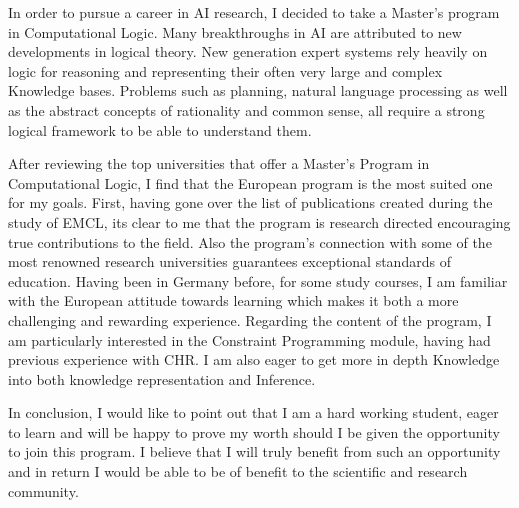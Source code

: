 \documentclass[10pt,stdletter,dateno,sigleft]{newlfm} %
\begin{document}
\begin{newlfm}
  In order to pursue a career in AI research, I decided to take a Master's program in
  Computational Logic. Many breakthroughs in AI are attributed to new
  developments in logical theory. New generation expert systems rely heavily on
  logic for reasoning and representing their often very large and complex
  Knowledge bases. Problems such as planning, natural language processing as
  well as the abstract concepts of rationality and common sense, all require
  a strong logical framework to be able to understand them.

  After reviewing the top universities that offer a Master's Program in
  Computational Logic, I find that the European program is the most suited one
  for my goals. First, having gone over the list of publications created during
  the study of EMCL, its clear to me that the program is research directed
  encouraging true contributions to the field. Also the program's connection
  with some of the most renowned research universities guarantees exceptional
  standards of education. Having been in Germany before, for some study courses,
  I am familiar with the European attitude towards learning which makes it both
  a more challenging and rewarding experience. Regarding the content of the
  program, I am particularly interested in the Constraint Programming module,
  having had previous experience with CHR. I am also eager to get more in depth
  Knowledge into both knowledge representation and Inference.

  In conclusion, I would like to point out that I am a hard working student,
  eager to learn and will be happy to prove my worth should I be given the
  opportunity to join this program. I believe that I will truly benefit from
  such an opportunity and in return I would be able to be of benefit to the
  scientific and research community.

\end{newlfm}
\end{document}
